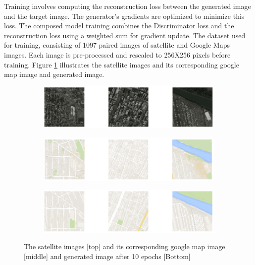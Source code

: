 \documentclass[12pt,twoside,a4paper,parskip]{scrbook} %
\begin{document}
Training involves computing the reconstruction loss between the generated image and the target image. The generator's gradients are optimized to minimize this loss. The composed model training combines the Discriminator loss and the reconstruction loss using a weighted sum for gradient update. The dataset used for training, consisting of 1097 paired images of satellite and Google Maps images. Each image is pre-processed and rescaled to 256X256 pixels before training. Figure \ref{fig:p2p} illustrates the satellite images and its corresponding google map image and generated image.
\begin{figure}[htb]
    \centering
    \begin{subfigure}{0.6\textwidth}
        \centering
        \includegraphics[width=\linewidth]{Images/pix2pix1.png}
    \end{subfigure}
    \hfill
    \begin{subfigure}{0.6\textwidth}
        \centering
        \includegraphics[width=\linewidth]{Images/pix2pix2.png}
    \end{subfigure}
    \hfill
    \begin{subfigure}{0.6\textwidth}
        \centering
        \includegraphics[width=\linewidth]{Images/pix2pix3.png}
    \end{subfigure}
    \caption[Frames of video generated by Pix2Pix GAN]{The satellite images [top] and its corresponding google map image [middle] and generated image after 10 epochs [Bottom]}
    \label{fig:p2p}
\end{figure}
\end{document}
